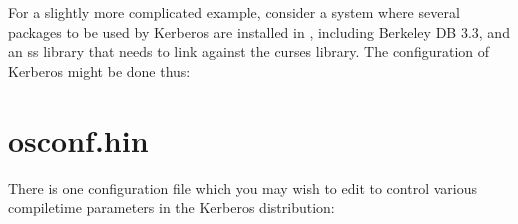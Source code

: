 \documentclass[letterpaper,10pt,english]{sphinxmanual}
\begin{document}
\sphinxAtStartPar
For a slightly more complicated example, consider a system where
several packages to be used by Kerberos are installed in
, including Berkeley DB 3.3, and an ss library that
needs to link against the curses library.  The configuration of
Kerberos might be done thus:

\begin{sphinxVerbatim}[commandchars=\\\{\}]
   \PYGZbs{}
    \PYGZbs{}
   
\end{sphinxVerbatim}

\sphinxstepscope


\section{osconf.hin}
\label{\detokenize{build/osconf:osconf-hin}}\label{\detokenize{build/osconf::doc}}
\sphinxAtStartPar
There is one configuration file which you may wish to edit to control
various compile\sphinxhyphen{}time parameters in the Kerberos distribution:

\begin{sphinxVerbatim}[commandchars=\\\{\}]
\end{sphinxVerbatim}
\end{document}
